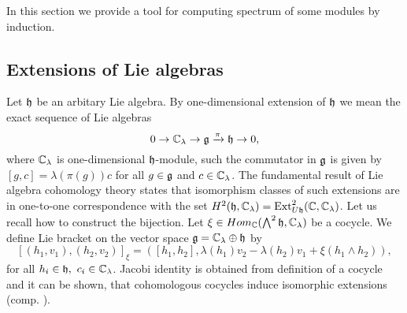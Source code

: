 In this section we provide a tool for computing spectrum of some modules by induction.

\subsection{Extensions of Lie algebras}
Let $\mathfrak{h}$ be an arbitary Lie algebra. By one-dimensional extension of $\mathfrak{h}$ we mean the exact
sequence of Lie algebras
\[
    0 \to \mathbb{C}_\lambda\rightarrow \mathfrak{g} \xrightarrow\pi \mathfrak{h} \to 0,
\]
where $\mathbb{C}_\lambda$ is one-dimensional $\mathfrak{h}$-module, such the commutator in $\mathfrak{g}$ is given by
$[g,c] = \lambda(\pi(g))c$ for all $g \in \mathfrak{g}$ and $c \in \mathbb{C}_\lambda$.  The fundamental result of
Lie algebra cohomology theory states that isomorphism classes of such extensions are in one-to-one
correspondence with the set $H^2(\mathfrak{h},\mathbb{C}_\lambda) = \operatorname{Ext}^2_{U\mathfrak{h}}(\mathbb{C}, \mathbb{C}_\lambda)$. Let
us recall how to construct the bijection. Let $\xi \in Hom_{\mathbb{C}}(\bigwedge^2\mathfrak{h}, \mathbb{C}_\lambda)$ be a
cocycle. We define Lie bracket on the vector space $\mathfrak{g} = \mathbb{C}_\lambda \oplus \mathfrak{h}$ by 
\[
    [(h_1, v_1), (h_2, v_2)]_\xi= ([h_1, h_2], \lambda(h_1) v_2 - \lambda(h_2) v_1 +
    \xi(h_1\wedge h_2)), 
\]
for all $h_i \in \mathfrak{h},~c_i\in \mathbb{C}_\lambda$. Jacobi identity is obtained from definition of a
cocycle and it can be shown, that cohomologous cocycles induce isomorphic extensions (comp.
\cite{weibel}).

